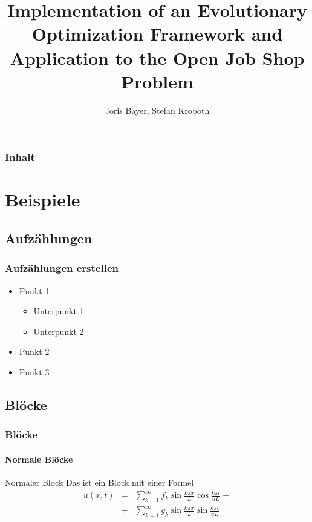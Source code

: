 \documentclass[%
14pt
]{beamer}
\title{Implementation of an Evolutionary Optimization Framework and Application to the Open Job Shop Problem}
\author{Joris Bayer, Stefan Kroboth}
\begin{document}

\begin{frame}[plain]
  \frametitle{}
  \titlepage %
\end{frame}



\begin{frame}
  \frametitle{Inhalt}
        \tableofcontents[hideallsubsections %
                        ] %
\end{frame}

\section{Beispiele}

\subsection{Aufzählungen}
\begin{frame}
	\frametitle{Aufzählungen erstellen}
	\begin{spacing}{1.5}
	\begin{itemize}
		\item Punkt 1
		\begin{itemize}
			\item Unterpunkt 1
			\item Unterpunkt 2
		\end{itemize}
		\item Punkt 2
		\item Punkt 3
	\end{itemize}
	\end{spacing}
\end{frame}


\subsection{Blöcke}
\begin{frame}
	\frametitle{Blöcke}
	\framesubtitle{Normale Blöcke}
	\begin{block}{Normaler Block}
		Das ist ein Block mit einer Formel
		\begin{eqnarray*}
		u(x,t) & = & \sum_{k=1}^{\infty} f_k \sin \frac{k \pi x}{L} \cos 
					 \frac{k \pi t}{aL} + \\
			   & + & \sum_{k=1}^{\infty} g_k \sin \frac{k \pi x}{L} \sin 
					 \frac{k \pi t}{aL} \\
		\end{eqnarray*}
	\end{block}
\end{frame}
\end{document}

